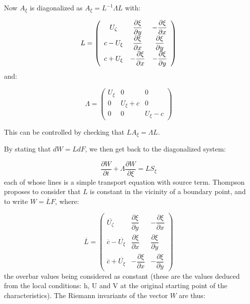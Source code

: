 Now $A_{\xi }$ is diagonalized as $A_{\xi }=L^{-1}\Lambda L$ with:

\begin{equation*}
L=\left( 
\begin{array}{ccc}
U_{\zeta } & \dfrac{\partial \xi }{\partial y} & -\dfrac{\partial \xi }{%
\partial x} \\ 
c-U_{\xi } & \dfrac{\partial \xi }{\partial x} & \dfrac{\partial \xi }{%
\partial y} \\ 
c+U_{\xi } & -\dfrac{\partial \xi }{\partial x} & -\dfrac{\partial \xi }{%
\partial y}%
\end{array}
\right)
\end{equation*}
and:

\begin{equation*}
\Lambda =\left( 
\begin{array}{ccc}
U_{\xi } & 0 & 0 \\ 
0 & U_{\xi }+c & 0 \\ 
0 & 0 & U_{\xi }-c%
\end{array}
\right)
\end{equation*}

This can be controlled by checking that $LA_{\xi }=\Lambda L$.

By stating that $dW=LdF$, we then get back to the diagonalized system:

\begin{equation}
\dfrac{\partial W}{\partial t}+\Lambda \dfrac{\partial W}{\partial \xi }%
=LS_{\xi }  \label{equacaract}
\end{equation}
each of whose lines is a simple transport equation with source term.
Thompson proposes to consider that $L$ is constant in the vicinity of a
boundary point, and to write $W=\overline{L}F$, where:

\begin{equation}
\overline{L}=\left( 
\begin{array}{ccc}
\overline{U_{\zeta }} & \dfrac{\partial \xi }{\partial y} & -\dfrac{\partial
\xi }{\partial x} \\ 
\overline{c}-\overline{U_{\xi }} & \dfrac{\partial \xi }{\partial x} & 
\dfrac{\partial \xi }{\partial y} \\ 
\overline{c}+\overline{U_{\xi }} & -\dfrac{\partial \xi }{\partial x} & -%
\dfrac{\partial \xi }{\partial y}%
\end{array}
\right)
\end{equation}
the overbar values being considered as constant (these are the values
deduced from the local conditions: h, U and V at the original starting point
of the characteristics). The Riemann invariants of the vector $W$ are thus:

